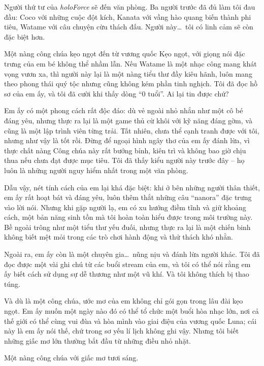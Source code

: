 \documentclass[../main.tex]{subfiles}
\begin{document}

Người thứ tư của \textit{holoForce} sẽ đến văn phòng. Ba người trước đã đủ làm tôi đau đầu: Coco với những cuộc đột kích, Kanata với vầng hào quang biến thành phi tiêu, Watame với câu chuyện cừu thách đấu. Người này\dots\ tôi có linh cảm sẽ còn đặc biệt hơn.

Một nàng công chúa kẹo ngọt đến từ vương quốc Kẹo ngọt, với giọng nói đặc trưng của em bé không thể nhầm lẫn. Nếu Watame là một nhạc công mang khát vọng vươn xa, thì người này lại là một nàng tiểu thư đầy kiêu hãnh, luôn mang theo phong thái quý tộc nhưng cũng không kém phần tinh nghịch. Tôi đã đọc hồ sơ của em ấy, và tôi đã cười khi thấy dòng ``0 tuổi''. Ai lại tin được chứ?

Em ấy có một phong cách rất độc đáo: dù vẻ ngoài nhỏ nhắn như một cô bé đáng yêu, nhưng thực ra lại là một game thủ cừ khôi với kỹ năng đáng gờm, và cũng là một lập trình viên từng trải. Tất nhiên, chưa thể cạnh tranh được với tôi, nhưng như vậy là tốt rồi. Đừng để ngoại hình ngây thơ của em ấy đánh lừa, vì thực chất nàng Công chúa này rất bướng bỉnh, kiên trì và không bao giờ chịu thua nếu chưa đạt được mục tiêu. Tôi đã thấy kiểu người này trước đây – họ luôn là những người nguy hiểm nhất trong một văn phòng.

Dẫu vậy, nét tính cách của em lại khá đặc biệt: khi ở bên những người thân thiết, em ấy rất hoạt bát và đáng yêu, luôn thêm thắt những câu ``nanora'' đặc trưng vào lời nói. Nhưng khi gặp người lạ, em có xu hướng điềm tĩnh và giữ khoảng cách, một bản năng sinh tồn mà tôi hoàn toàn hiểu được trong môi trường này. Bề ngoài trông như một tiểu thư yếu đuối, nhưng thực ra lại là một chiến binh không biết mệt mỏi trong các trò chơi hành động và thử thách khó nhằn.

Ngoài ra, em ấy còn là một chuyên gia\dots\ nũng nịu và đánh lừa người khác. Tôi đã đọc được một vài ghi chú từ các buổi stream của em, và tôi có thể nói rằng em ấy biết cách sử dụng sự dễ thương như một vũ khí. Và tôi không thích bị thao túng.

Và dù là một công chúa, ước mơ của em không chỉ gói gọn trong lâu đài kẹo ngọt. Em ấy muốn một ngày nào đó có thể tổ chức một buổi hòa nhạc lớn, nơi cả thế giới có thể cùng vui đùa và hòa mình vào giai điệu của vương quốc Luna; cái này là em ấy nói thế, chứ trong sơ yếu lí lịch không ghi vậy. Nhưng tôi biết những giấc mơ lớn thường bắt đầu từ những điều nhỏ nhặt.

Một nàng công chúa với giấc mơ tươi sáng.
\end{document}
